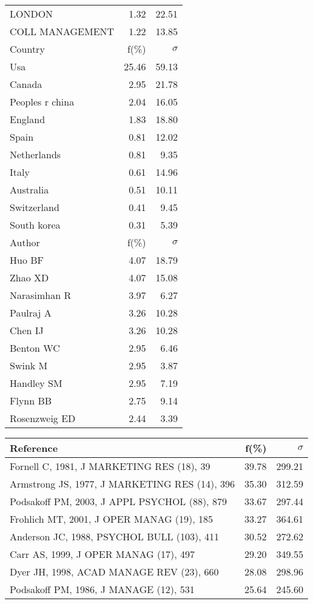 \documentclass[a4paper,11pt]{report}
\begin{document}
\begin{landscape}
\begin{table}[!ht]
{\begin{tabular}{|l r r|}
LONDON & 1.32 & 22.51\\
COLL MANAGEMENT & 1.22 & 13.85\\
\hline
\hline
Country & f(\%) & $\sigma$\\
\hline
Usa & 25.46 & 59.13\\
Canada & 2.95 & 21.78\\
Peoples r china & 2.04 & 16.05\\
England & 1.83 & 18.80\\
Spain & 0.81 & 12.02\\
Netherlands & 0.81 & 9.35\\
Italy & 0.61 & 14.96\\
Australia & 0.51 & 10.11\\
Switzerland & 0.41 & 9.45\\
South korea & 0.31 & 5.39\\
\hline
\hline
Author & f(\%) & $\sigma$\\
\hline
Huo BF & 4.07 & 18.79\\
Zhao XD & 4.07 & 15.08\\
Narasimhan R & 3.97 & 6.27\\
Paulraj A & 3.26 & 10.28\\
Chen IJ & 3.26 & 10.28\\
Benton WC & 2.95 & 6.46\\
Swink M & 2.95 & 3.87\\
Handley SM & 2.95 & 7.19\\
Flynn BB & 2.75 & 9.14\\
Rosenzweig ED & 2.44 & 3.39\\
\hline
\end{tabular}
}
{\scriptsize\begin{tabular}{|l r r|}
\hline
Reference & f(\%) & $\sigma$\\
\hline
Fornell C, 1981, J MARKETING RES (18), 39 & 39.78 & 299.21\\
Armstrong JS, 1977, J MARKETING RES (14), 396 & 35.30 & 312.59\\
Podsakoff PM, 2003, J APPL PSYCHOL (88), 879 & 33.67 & 297.44\\
Frohlich MT, 2001, J OPER MANAG (19), 185 & 33.27 & 364.61\\
Anderson JC, 1988, PSYCHOL BULL (103), 411 & 30.52 & 272.62\\
Carr AS, 1999, J OPER MANAG (17), 497 & 29.20 & 349.55\\
Dyer JH, 1998, ACAD MANAGE REV (23), 660 & 28.08 & 298.96\\
Podsakoff PM, 1986, J MANAGE (12), 531 & 25.64 & 245.60\\

\end{tabular}}
\end{table}
\end{landscape}
\end{document}
